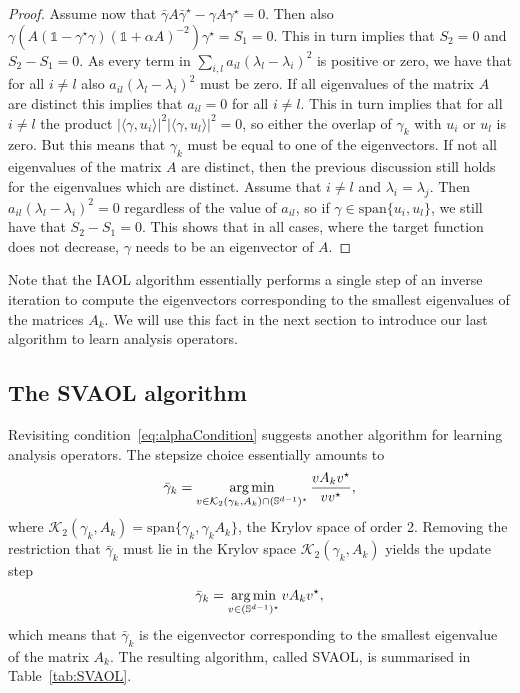 \documentclass[11pt, onecolumn, journal,compsoc]{IEEEtran}
\newcommand\ip[2]{\langle #1, #2\rangle}
\newcommand\bgamma{\bar\gamma}
\renewcommand{\S}{\mathbb{S}}
\DeclareMathOperator*{\argmin}{\text{arg\,min}}
\newcommand{\id}{\mathds{1}}
\theoremstyle{plain}
\theoremstyle{remark}
\begin{document}
\begin{proof}
Assume now that $\bgamma A \bgamma^\star - \gamma A\gamma^\star = 0$. Then also $\gamma (A(\id - \gamma^\star\gamma)(\id +\alpha A)^{-2})\gamma^\star = S_1 =0$. This in turn implies that $S_2 = 0$ and $S_2-S_1 = 0$.
As every term in $\sum_{i,l} a_{il}(\lambda_l - \lambda_i)^2$ is positive or zero, we have that for all $i\neq l$ also $a_{il}(\lambda_l - \lambda_i)^2$ must be zero.
If all eigenvalues of the matrix $A$ are distinct this implies that $a_{il} = 0$ for all $i\neq l$. This in turn implies that for all $i\neq l$ the product $|\ip{\gamma}{u_i}|^2|\ip{\gamma}{u_l}|^2=0$, so either the overlap of $\gamma_k$ with $u_i$ or $u_l$ is zero. But this means that $\gamma_k$ must be equal to one of the eigenvectors.
If not all eigenvalues of the matrix $A$ are distinct, then the previous discussion still holds for the eigenvalues which are distinct. Assume that $i\neq l$ and $\lambda_i = \lambda_j$. Then $a_{il}(\lambda_l - \lambda_i)^2 = 0$ regardless of the value of $a_{il}$, so if $\gamma\in \mathrm{span}\{u_i,u_l\}$, we still have that $S_2-S_1 = 0$. This shows that in all cases, where the target function does not decrease, $\gamma$ needs to be an eigenvector of $A$.
\end{proof}

Note that the IAOL algorithm essentially performs a single step of an inverse iteration to compute the eigenvectors corresponding to the smallest eigenvalues of the matrices $A_k$. We will use this fact in the next section to introduce our last algorithm to learn analysis operators.


\subsection{The SVAOL algorithm}

Revisiting condition~\eqref{eq:alphaCondition} suggests another algorithm for learning analysis operators. The stepsize choice essentially amounts to
\[\bgamma_k = \argmin_{v\in\mathcal{K}_2(\gamma_k,A_k)\cap(\S^{d-1})^\star}\frac{v A_k v^\star}{v v^\star},\] 
where $\mathcal{K}_2(\gamma_k,A_k) = \text{span}\{\gamma_k,\gamma_k A_k\}$, the Krylov space of order 2.
Removing the restriction that $\bgamma_k$ must lie in the Krylov space $\mathcal{K}_2(\gamma_k,A_k)$ yields the update step
\[\bgamma_k = \argmin_{v\in(\S^{d-1})^\star}v A_k v^\star,\]
which means that $\bgamma_k$ is the eigenvector corresponding to the smallest eigenvalue of the matrix $A_k$. The resulting algorithm, called SVAOL, is summarised in Table~\ref{tab:SVAOL}.
\end{document}
